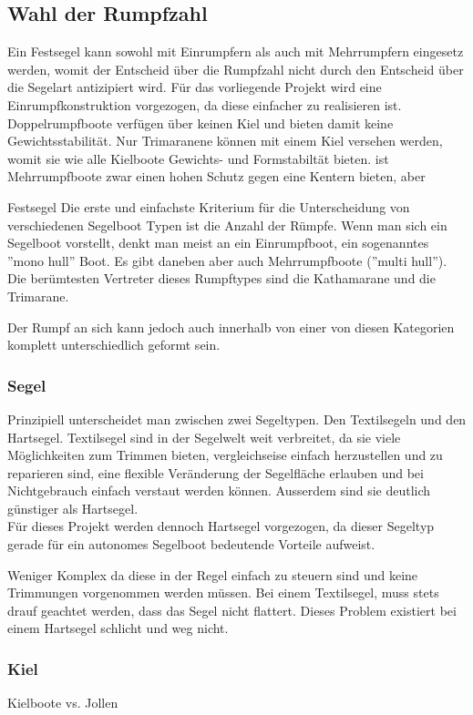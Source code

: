 \subsection{Wahl der Rumpfzahl}
Ein Festsegel kann sowohl mit Einrumpfern als auch mit Mehrrumpfern eingesetz werden, womit der Entscheid über die Rumpfzahl nicht durch den Entscheid über die Segelart antizipiert wird.  
Für das vorliegende Projekt wird eine Einrumpfkonstruktion vorgezogen, da diese einfacher zu realisieren ist. Doppelrumpfboote verfügen über keinen Kiel und bieten damit keine Gewichtsstabilität. Nur Trimaranene können mit einem Kiel versehen werden, womit sie wie alle Kielboote Gewichts- und Formstabiltät bieten.  ist  Mehrrumpfboote zwar einen hohen Schutz gegen eine Kentern bieten, aber 

Festsegel Die erste und einfachste Kriterium für die Unterscheidung von verschiedenen Segelboot Typen ist die Anzahl der  Rümpfe. Wenn man sich ein Segelboot vorstellt, denkt man meist an ein Einrumpfboot, ein sogenanntes ”mono hull” Boot. Es gibt daneben aber auch Mehrrumpfboote (”multi hull”). Die berümtesten Vertreter dieses Rumpftypes sind die Kathamarane und die Trimarane.

Der Rumpf an sich kann jedoch auch innerhalb von einer von diesen Kategorien komplett unterschiedlich geformt sein.

\subsubsection{Segel}
Prinzipiell unterscheidet man zwischen zwei Segeltypen. Den Textilsegeln und den Hartsegel.
Textilsegel sind in der Segelwelt weit verbreitet, da sie viele Möglichkeiten zum Trimmen bieten,  vergleichseise einfach herzustellen und zu reparieren sind, eine flexible Veränderung der Segelfläche erlauben und bei Nichtgebrauch einfach verstaut werden können. Ausserdem sind sie deutlich günstiger als Hartsegel. 
\\
Für dieses Projekt werden dennoch Hartsegel vorgezogen, da dieser Segeltyp gerade für ein autonomes Segelboot bedeutende Vorteile aufweist. 




Weniger Komplex
da diese in der Regel einfach zu steuern sind und keine Trimmungen vorgenommen werden müssen. 
Bei einem Textilsegel, muss stets drauf geachtet werden, dass das Segel nicht flattert. Dieses Problem existiert bei einem Hartsegel schlicht und weg nicht.

\subsubsection{Kiel}
Kielboote vs. Jollen

